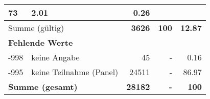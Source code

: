 \begin{longtable}{lXrrr}
       \num{73} &
       \num[round-mode=places,round-precision=2]{2.01} &
         \num[round-mode=places,round-precision=2]{0.26} \\
     \midrule
     \multicolumn{2}{l}{Summe (gültig)} &
       \textbf{\num{3626}} &
     \textbf{\num{100}} &
       \textbf{\num[round-mode=places,round-precision=2]{12.87}} \\
     \multicolumn{5}{l}{\textbf{Fehlende Werte}}\\
       -998 &
       keine Angabe &
         \num{45} &
        - &
         \num[round-mode=places,round-precision=2]{0.16} \\
       -995 &
       keine Teilnahme (Panel) &
         \num{24511} &
        - &
         \num[round-mode=places,round-precision=2]{86.97} \\
     \midrule
     \multicolumn{2}{l}{\textbf{Summe (gesamt)}} &
          \textbf{\num{28182}} &
        \textbf{-} &
        \textbf{\num{100}} \\
     \bottomrule
     \end{longtable}
     
